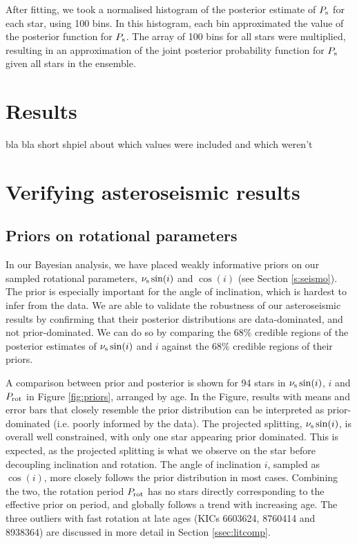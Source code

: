 \documentclass[12pt]{article}
\begin{document}
After fitting, we took a normalised histogram of the posterior estimate of $P_{\rm s}$ for each star, using 100 bins. In this histogram, each bin approximated the value of the posterior function for $P_{\rm s}$. The array of 100 bins for all stars were multiplied, resulting in an approximation of the joint posterior probability function for $P_{\rm s}$ given all stars in the ensemble.



\section{Results}
bla bla short shpiel about which values were included and which weren't

\section{Verifying asteroseismic results}
\subsection{Priors on rotational parameters}
In our Bayesian analysis, we have placed weakly informative priors on our sampled rotational parameters, $\nu_{\rm s}\sin(i)$ and $\cos(i)$ (see Section \ref{s:seismo}). The prior is especially important for the angle of inclination, which is hardest to infer from the data. We are able to validate the robustness of our asteroseismic results by confirming that their posterior distributions are data-dominated, and not prior-dominated. We can do so by comparing the $68\%$ credible regions of the posterior estimates of $\nu_{\rm s}\sin(i)$ and $i$ against the $68\%$ credible regions of their priors.

A comparison between prior and posterior is shown for 94 stars in $\nu_{\rm s}\sin(i)$, $i$ and $P_{\rm rot}$ in Figure \ref{fig:priors}, arranged by age. In the Figure, results with means and error bars that closely resemble the prior distribution can be interpreted as prior-dominated (i.e. poorly informed by the data). The projected splitting, $\nu_{\rm s}\sin(i)$, is overall well constrained, with only one star appearing prior dominated. This is expected, as the projected splitting is what we observe on the star before decoupling inclination and rotation. The angle of inclination $i$, sampled as $\cos(i)$, more closely follows the prior distribution in most cases. Combining the two, the rotation period $P_{\rm rot}$ has no stars directly corresponding to the effective prior on period, and globally follows a trend with increasing age. The three outliers with fast rotation at late ages (KICs 6603624, 8760414 and 8938364) are discussed in more detail in Section \ref{ssec:litcomp}.
\end{document}
